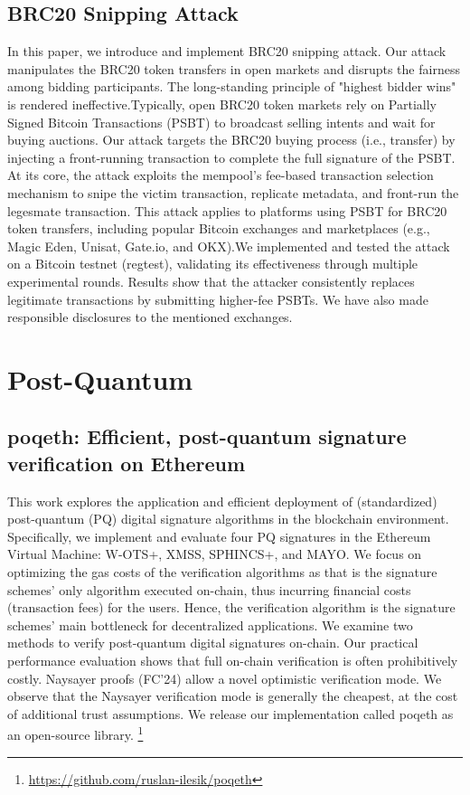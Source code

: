 \documentclass[11pt]{article}
\theoremstyle{definition}
\theoremstyle{remark}
\theoremstyle{plain}
\begin{document}
\subsection{\cite{10.1145/3708821.3736200} BRC20 Snipping Attack}
In this paper, we introduce and implement BRC20 snipping attack. Our attack manipulates the BRC20 token transfers in open markets and disrupts the fairness among bidding participants. The long-standing principle of "highest bidder wins" is rendered ineffective.Typically, open BRC20 token markets rely on Partially Signed Bitcoin Transactions (PSBT) to broadcast selling intents and wait for buying auctions. Our attack targets the BRC20 buying process (i.e., transfer) by injecting a front-running transaction to complete the full signature of the PSBT. At its core, the attack exploits the mempool’s fee-based transaction selection mechanism to snipe the victim transaction, replicate metadata, and front-run the legesmate transaction. This attack applies to platforms using PSBT for BRC20 token transfers, including popular Bitcoin exchanges and marketplaces (e.g., Magic Eden, Unisat, Gate.io, and OKX).We implemented and tested the attack on a Bitcoin testnet (regtest), validating its effectiveness through multiple experimental rounds. Results show that the attacker consistently replaces legitimate transactions by submitting higher-fee PSBTs. We have also made responsible disclosures to the mentioned exchanges.


\section{Post-Quantum}
\subsection{\cite{10.1145/3708821.3736193} poqeth: Efficient, post-quantum signature verification on Ethereum}
This work explores the application and efficient deployment of (standardized) post-quantum (PQ) digital signature algorithms in the blockchain environment. Specifically, we implement and evaluate four PQ signatures in the Ethereum Virtual Machine: W-OTS+, XMSS, SPHINCS+, and MAYO. We focus on optimizing the gas costs of the verification algorithms as that is the signature schemes’ only algorithm executed on-chain, thus incurring financial costs (transaction fees) for the users. Hence, the verification algorithm is the signature schemes’ main bottleneck for decentralized applications.
We examine two methods to verify post-quantum digital signatures on-chain. Our practical performance evaluation shows that full on-chain verification is often prohibitively costly. Naysayer proofs (FC’24) \cite{seres2024} allow a novel optimistic verification mode. We observe that the Naysayer verification mode is generally the cheapest, at the cost of additional trust assumptions. We release our implementation called poqeth as an open-source library. \footnote{\url{https://github.com/ruslan-ilesik/poqeth}}
\end{document}
